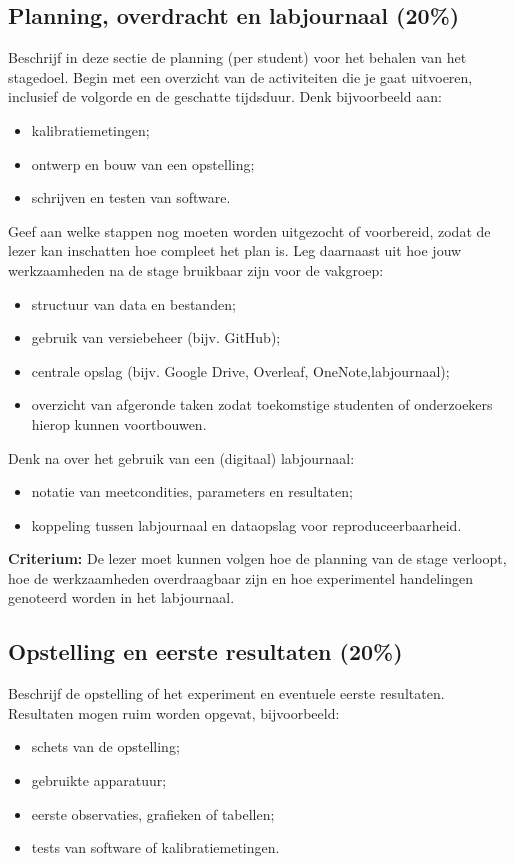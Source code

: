 \documentclass[a4paper,11pt]{article}
\begin{document}
\subsection*{Planning, overdracht en labjournaal \textbf{(20\%)}}
Beschrijf in deze sectie de planning (per student) voor het behalen van het stagedoel. Begin met een overzicht van de activiteiten die je gaat uitvoeren, inclusief de volgorde en de geschatte tijdsduur. Denk bijvoorbeeld aan:
\begin{itemize}[leftmargin=1.5cm, partopsep=1pt, itemsep=2pt, parsep=0pt]
    \item kalibratiemetingen;
    \item ontwerp en bouw van een opstelling;
    \item schrijven en testen van software.
\end{itemize}
Geef aan welke stappen nog moeten worden uitgezocht of voorbereid, zodat de lezer kan inschatten hoe compleet het plan is. Leg daarnaast uit hoe jouw werkzaamheden na de stage bruikbaar zijn voor de vakgroep:
\begin{itemize}[leftmargin=1.5cm, partopsep=1pt, itemsep=2pt, parsep=0pt]
    \item structuur van data en bestanden;
    \item gebruik van versiebeheer (bijv. GitHub);
    \item centrale opslag (bijv. Google Drive, Overleaf, OneNote,labjournaal);
    \item overzicht van afgeronde taken zodat toekomstige studenten of onderzoekers hierop kunnen voortbouwen.
\end{itemize}

Denk na over het gebruik van een (digitaal) labjournaal:
\begin{itemize}[leftmargin=1.5cm, partopsep=1pt, itemsep=2pt, parsep=0pt]
    \item notatie van meetcondities, parameters en resultaten;
    \item koppeling tussen labjournaal en dataopslag voor reproduceerbaarheid.
\end{itemize}

\textbf{Criterium:} De lezer moet kunnen volgen hoe de planning van de stage verloopt, hoe de werkzaamheden overdraagbaar zijn en hoe experimentel handelingen genoteerd worden in het labjournaal.

\subsection*{Opstelling en eerste resultaten \textbf{(20\%)}}
Beschrijf de opstelling of het experiment en eventuele eerste resultaten. Resultaten mogen ruim worden opgevat, bijvoorbeeld:
\begin{itemize}[leftmargin=1.5cm, partopsep=1pt, itemsep=2pt, parsep=0pt]
    \item schets van de opstelling;
    \item gebruikte apparatuur;
    \item eerste observaties, grafieken of tabellen;
    \item tests van software of kalibratiemetingen.
\end{itemize}
\end{document}
